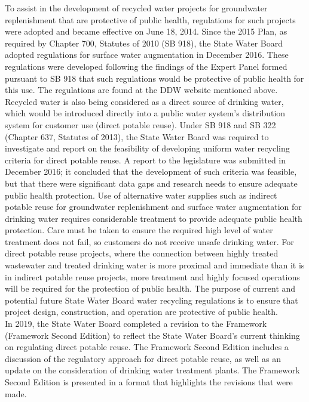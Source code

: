 \begin{itemize}
\begin{enumerate}
\begin{itemize}
To assist in the development of recycled water projects for groundwater replenishment that are protective of public health, regulations for such projects were adopted and became effective on June 18, 2014.
Since the 2015 Plan, as required by Chapter 700, Statutes of 2010 (SB 918), the State Water Board adopted regulations for surface water augmentation in December 2016. These regulations were developed following the findings of the Expert Panel formed pursuant to SB 918 that such regulations would be protective of public health for this use. The regulations are found at the DDW website mentioned above.
Recycled water is also being considered as a direct source of drinking water, which would be introduced directly into a public water system’s distribution system for customer use (direct potable reuse). Under SB 918 and SB 322 (Chapter 637, Statutes of 2013), the State Water Board was required to investigate and report on the feasibility of developing uniform water recycling criteria for direct potable reuse. A report to the legislature was submitted in December 2016; it concluded that the development of such criteria was feasible, but that there were significant data gaps and research needs to ensure adequate public health protection.
Use of alternative water supplies such as indirect potable reuse for groundwater replenishment and surface water augmentation for drinking water requires considerable treatment to provide adequate public health protection. Care must be taken to ensure the required high level of water treatment does not fail, so customers do not receive unsafe
drinking water. For direct potable reuse projects, where the connection between highly treated wastewater and treated drinking water is more proximal and immediate than it is in indirect potable reuse projects, more treatment and highly focused operations will be required for the protection of public health.
The purpose of current and potential future State Water Board water recycling regulations is to ensure that project design, construction, and operation are protective of public health. \\
In 2019, the State Water Board completed a revision to the Framework (Framework Second Edition) to reflect the State Water Board’s current thinking on regulating direct potable reuse. The Framework Second Edition includes a discussion of the regulatory approach for direct potable reuse, as well as an update on the consideration of drinking water treatment plants. The Framework Second Edition is presented in a format that highlights the revisions that were made.

\end{itemize}
\end{enumerate}
\end{itemize}
